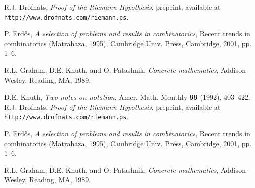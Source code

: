 \begin{thebibliography}{99}

 R.J. Drofnats, \emph{Proof of the Riemann
Hypothesis},  preprint, available at
\texttt{http://www.drofnats.com/riemann.ps}.

 P. Erd\H os, \emph{A selection of problems and
results in combinatorics}, Recent trends in combinatorics
(Matrahaza, 1995), Cambridge Univ. Press, Cambridge, 2001, pp. 1--6.

R.L. Graham, D.E. Knuth, and O. Patashnik, \emph{Concrete
mathematics}, Addison-Wesley, Reading, MA, 1989.

 D.E. Knuth, \emph{Two notes on notation}, Amer.
Math. Monthly \textbf{99} (1992), 403--422.
 R.J. Drofnats, \emph{Proof of the Riemann
Hypothesis},  preprint, available at
\texttt{http://www.drofnats.com/riemann.ps}.

 P. Erd\H os, \emph{A selection of problems and
results in combinatorics}, Recent trends in combinatorics
(Matrahaza, 1995), Cambridge Univ. Press, Cambridge, 2001, pp. 1--6.

R.L. Graham, D.E. Knuth, and O. Patashnik, \emph{Concrete
mathematics}, Addison-Wesley, Reading, MA, 1989.

\end{thebibliography}

